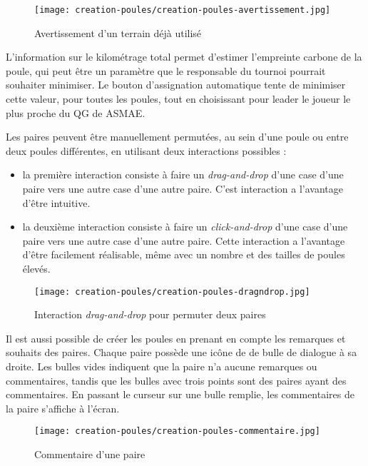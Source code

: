 \begin{figure}[H]
\centering
\texttt{[image: creation-poules/creation-poules-avertissement.jpg]}
\caption{Avertissement d'un terrain déjà utilisé}
\end{figure}

L'information sur le kilométrage total permet d'estimer l'empreinte carbone de la poule, qui peut être un paramètre que le responsable du tournoi pourrait souhaiter minimiser. Le bouton d'assignation automatique tente de minimiser cette valeur, pour toutes les poules, tout en choisissant pour leader le joueur le plus proche du QG de ASMAE.\newline

Les paires peuvent être manuellement permutées, au sein d'une poule ou entre deux poules différentes, en utilisant deux interactions possibles :

\begin{itemize}
\item la première interaction consiste à faire un \textit{drag-and-drop} d'une case d'une paire vers une autre case d'une autre paire. C'est interaction a l'avantage d'être intuitive.
\item la deuxième interaction consiste à faire un \textit{click-and-drop} d'une case d'une paire vers une autre case d'une autre paire. Cette interaction a l'avantage d'être facilement réalisable, même avec un nombre et des tailles de poules élevés.
\end{itemize}

\begin{figure}[H]
\centering
\texttt{[image: creation-poules/creation-poules-dragndrop.jpg]}
\caption{Interaction \textit{drag-and-drop} pour permuter deux paires}
\end{figure}

Il est aussi possible de créer les poules en prenant en compte les remarques et souhaits des paires. Chaque paire possède une icône de de bulle de dialogue à sa droite. Les bulles vides indiquent que la paire n'a aucune remarques ou commentaires, tandis que les bulles avec trois points sont des paires ayant des commentaires. En passant le curseur sur une bulle remplie, les commentaires de la paire s'affiche à l'écran.

\begin{figure}[H]
\centering
\texttt{[image: creation-poules/creation-poules-commentaire.jpg]}
\caption{Commentaire d'une paire}
\end{figure}

